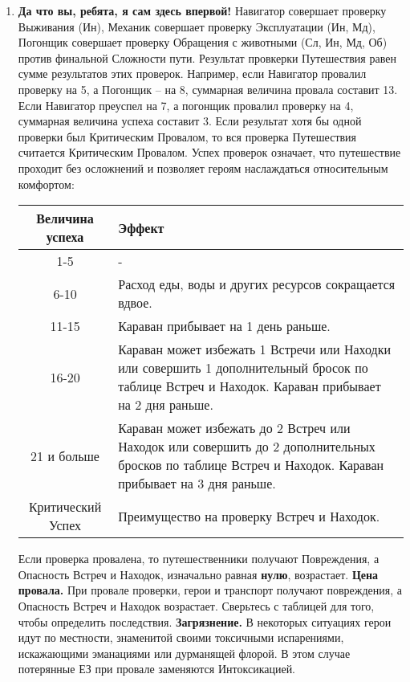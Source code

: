 \begin{enumerate}
\item \textbf{Да что вы, ребята, я сам здесь впервой!} Навигатор совершает проверку Выживания (Ин), Механик совершает проверку Эксплуатации (Ин, Мд), Погонщик совершает проверку Обращения с животными (Сл, Ин, Мд, Об) против финальной Сложности пути. Результат провкерки Путешествия равен сумме результатов этих проверок. Например, если Навигатор провалил проверку на 5, а Погонщик – на 8, суммарная величина провала составит 13. Если Навигатор преуспел на 7, а погонщик провалил проверку на 4, суммарная величина успеха составит 3.
\newline Если результат хотя бы одной проверки был Критическим Провалом, то вся проверка Путешествия считается Критическим Провалом.
\newline
Успех проверок означает, что путешествие проходит без осложнений и позволяет героям наслаждаться относительным комфортом:
\begin{center}
\begin{tabular}{|c|p{10cm}|}
\hline
Величина успеха & Эффект \\ \hline
1-5 & - \\ \hline
6-10 & Расход еды, воды и других ресурсов сокращается вдвое. \\ \hline
11-15 & Караван прибывает на 1 день раньше. \\ \hline
16-20 & Караван может избежать 1 Встречи или Находки или совершить 1 дополнительный бросок по таблице Встреч и Находок. Караван прибывает на 2 дня раньше. \\ \hline
21 и больше & Караван может избежать до 2 Встреч или Находок или совершить до 2 дополнительных бросков по таблице Встреч и Находок. Караван прибывает на 3 дня раньше. \\ \hline
Критический Успех & Преимущество на проверку Встреч и Находок. \\ \hline
\end{tabular}
\end{center}
Если проверка провалена, то путешественники получают Повреждения, а Опасность Встреч и Находок, изначально равная \textbf{нулю}, возрастает.
\newline \textbf{Цена провала.} При провале проверки, герои и транспорт получают повреждения, а Опасность Встреч и Находок возрастает. Сверьтесь с таблицей для того, чтобы определить последствия.
\newline \textbf{Загрязнение.} В некоторых ситуациях герои идут по местности, знаменитой своими токсичными испарениями, искажающими эманациями или дурманящей флорой. В этом случае потерянные ЕЗ при провале заменяются Интоксикацией.

\end{enumerate}
